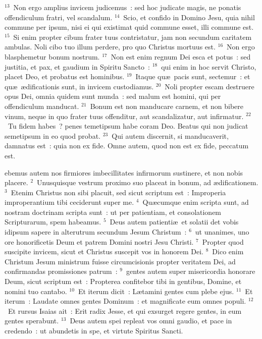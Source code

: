 ${}^{13}$~Non ergo amplius invicem judicemus~: sed hoc judicate magis, ne ponatis offendiculum fratri, vel scandalum.
${}^{14}$~Scio, et confido in Domino Jesu, quia nihil commune per ipsum, nisi ei qui existimat quid commune esset, illi commune est.
${}^{15}$~Si enim propter cibum frater tuus contristatur, jam non secundum caritatem ambulas. Noli cibo tuo illum perdere, pro quo Christus mortuus est.
${}^{16}$~Non ergo blasphemetur bonum nostrum.
${}^{17}$~Non est enim regnum Dei esca et potus~: sed justitia, et pax, et gaudium in Spiritu Sancto~:
${}^{18}$~qui enim in hoc servit Christo, placet Deo, et probatus est hominibus.
${}^{19}$~Itaque qu\ae\ pacis sunt, sectemur~: et qu\ae\ \ae dificationis sunt, in invicem custodiamus.
${}^{20}$~Noli propter escam destruere opus Dei, omnia quidem sunt munda~: sed malum est homini, qui per offendiculum manducat.
${}^{21}$~Bonum est non manducare carnem, et non bibere vinum, neque in quo frater tuus offenditur, aut scandalizatur, aut infirmatur.
${}^{22}$~Tu fidem habes~? penes temetipsum habe coram Deo. Beatus qui non judicat semetipsum in eo quod probat.
${}^{23}$~Qui autem discernit, si manducaverit, damnatus est~: quia non ex fide. Omne autem, quod non est ex fide, peccatum est.

\bchapter
{}ebemus autem nos firmiores imbecillitates infirmorum sustinere, et non nobis placere.
${}^{2}$~Unusquisque vestrum proximo suo placeat in bonum, ad \ae dificationem.
${}^{3}$~Etenim Christus non sibi placuit, sed sicut scriptum est~: Improperia improperantium tibi ceciderunt super me.
${}^{4}$~Qu\ae cumque enim scripta sunt, ad nostram doctrinam scripta sunt~: ut per patientiam, et consolationem Scripturarum, spem habeamus.
${}^{5}$~Deus autem patienti\ae\ et solatii det vobis idipsum sapere in alterutrum secundum Jesum Christum~:
${}^{6}$~ut unanimes, uno ore honorificetis Deum et patrem Domini nostri Jesu Christi.
${}^{7}$~Propter quod suscipite invicem, sicut et Christus suscepit vos in honorem Dei.
${}^{8}$~Dico enim Christum Jesum ministrum fuisse circumcisionis propter veritatem Dei, ad confirmandas promissiones patrum~:
${}^{9}$~gentes autem super misericordia honorare Deum, sicut scriptum est~: Propterea confitebor tibi in gentibus, Domine, et nomini tuo cantabo.
${}^{10}$~Et iterum dicit~: L\ae tamini gentes cum plebe ejus.
${}^{11}$~Et iterum~: Laudate omnes gentes Dominum~: et magnificate eum omnes populi.
${}^{12}$~Et rursus Isaias ait~: Erit radix Jesse, et qui exsurget regere gentes, in eum gentes sperabunt.
${}^{13}$~Deus autem spei repleat vos omni gaudio, et pace in credendo~: ut abundetis in spe, et virtute Spiritus Sancti.


